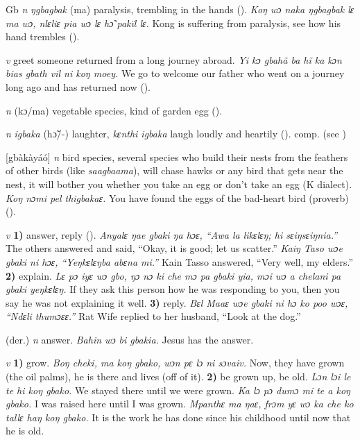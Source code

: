\begin{letter}{Gb}
 \textit{n} \textit{ŋgbagbak} (ma) paralysis, trembling in the hands (\citealt{Pichl1967}). \textit{Koŋ wɔ naka ŋgbagbak lɛ ma wɔ, nlɛliɛ pia wɔ lɛ hɔ̃ pakïl lɛ.} Kong is suffering from paralysis, see how his hand trembles (\citealt{Pichl1967}). 

 \textit{v} greet someone returned from a long journey abroad. \textit{Yi kɔ gbahã ba hĩ ka kɔn bias gbath vil ni koŋ moey.} We go to welcome our father who went on a journey long ago and has returned now (\citealt{Pichl1967}). 

 \textit{n} (kɔ/ma) vegetable species, kind of garden egg (\citealt{Pichl1967}). 

 \textit{n} \textit{igbaka} (hɔ̃/-) laughter, \textit{kɛnthi igbaka} laugh loudly and heartily (\citealt{Pichl1967}). comp.  (see ) 

 [gbàkàyáó] \textit{n} bird species, several species who build their nests from the feathers of other birds (like \textit{saagbaama}), will chase hawks or any bird that gets near the nest, it will bother you whether you take an egg or don't take an egg (K dialect). \textit{Koŋ nɔmi pel thigbakaɛ.} You have found the eggs of the bad-heart bird (proverb) (\citealt{TISLL1979}). 

 \textit{v} \textbf{1)} answer, reply (\citealt{Pichl1967}). \textit{Anyalɛ ŋae gbaki ŋa hɔɛ, “Awa la likɛlɛŋ; hi sɛiŋsɛiŋnia.”} The others answered and said, “Okay, it is good; let us scatter.” \textit{Kaiŋ Taso wɔe gbaki ni hɔɛ, “Yeŋkɛlɛŋba abɛna mi.”} Kain Tasso answered, “Very well, my elders.” \textbf{2)} explain. \textit{Lɛ pɔ iyɛ wɔ gbo, ŋɔ nɔ ki che mɔ pa gbaki yia, mɔi wɔ a chelani pa gbaki yeŋkɛlɛŋ.} If they ask this person how he was responding to you, then you say he was not explaining it well. \textbf{3)} reply. \textit{Bɛl Maaɛ wɔe gbaki ni hɔ ko poo wɔɛ, “Ndɛli thumɔɛɛ.”} Rat Wife replied to her husband, “Look at the dog.”

 (der.) \textit{n} answer. \textit{Bahin wɔ bi gbakia.} Jesus has the answer.

 \textit{v} \textbf{1)} grow. \textit{Boŋ cheki, ma koŋ gbako, wɔn pɛ lɔ ni sɔvaiv.} Now, they have grown (the oil palms), he is there and lives (off of it). \textbf{2)} be grown up, be old. \textit{Lɔn lɔi le te hi koŋ gbako.} We stayed there until we were grown. \textit{Ka lɔ pɔ dumɔ mi te a koŋ gbako.} I was raised here until I was grown. \textit{Mpanthɛ ma ŋaɛ, frɔm yɛ wɔ ka che ko tallɛ haŋ koŋ gbako.} It is the work he has done since his childhood until now that he is old.


\end{letter}
